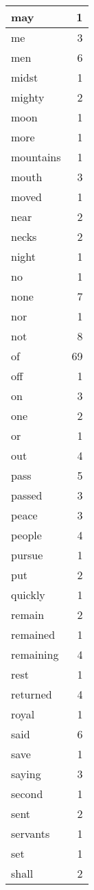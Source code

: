 \begin{center}
\begin{longtable}{l|r}
may & 1 \\ \hline
me & 3 \\ \hline
men & 6 \\ \hline
midst & 1 \\ \hline
mighty & 2 \\ \hline
moon & 1 \\ \hline
more & 1 \\ \hline
mountains & 1 \\ \hline
mouth & 3 \\ \hline
moved & 1 \\ \hline
near & 2 \\ \hline
necks & 2 \\ \hline
night & 1 \\ \hline
no & 1 \\ \hline
none & 7 \\ \hline
nor & 1 \\ \hline
not & 8 \\ \hline
of & 69 \\ \hline
off & 1 \\ \hline
on & 3 \\ \hline
one & 2 \\ \hline
or & 1 \\ \hline
out & 4 \\ \hline
pass & 5 \\ \hline
passed & 3 \\ \hline
peace & 3 \\ \hline
people & 4 \\ \hline
pursue & 1 \\ \hline
put & 2 \\ \hline
quickly & 1 \\ \hline
remain & 2 \\ \hline
remained & 1 \\ \hline
remaining & 4 \\ \hline
rest & 1 \\ \hline
returned & 4 \\ \hline
royal & 1 \\ \hline
said & 6 \\ \hline
save & 1 \\ \hline
saying & 3 \\ \hline
second & 1 \\ \hline
sent & 2 \\ \hline
servants & 1 \\ \hline
set & 1 \\ \hline
shall & 2 \\ \hline

\end{longtable}
\end{center}
